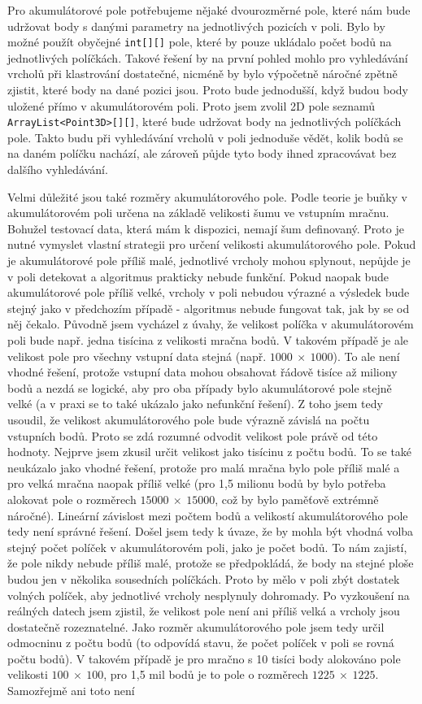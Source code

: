 \documentclass[11pt,twoside,a4paper]{book}
\begin{document}
Pro akumulátorové pole potřebujeme nějaké dvourozměrné pole, které nám bude udržovat body  s danými parametry na jednotlivých pozicích v poli. Bylo by možné použít obyčejné \verb|int[][]| pole, které by pouze ukládalo počet bodů na jednotlivých políčkách. Takové řešení by na první pohled mohlo pro vyhledávání vrcholů při klastrování dostatečné, nicméně by bylo výpočetně náročné zpětně zjistit, které body na dané pozici jsou. Proto bude jednodušší, když budou body uložené přímo v akumulátorovém poli. Proto jsem zvolil 2D pole seznamů \verb|ArrayList<Point3D>[][]|, které bude udržovat body na jednotlivých políčkách pole. Takto budu při vyhledávání vrcholů v poli jednoduše vědět, kolik bodů se na daném políčku nachází, ale zároveň půjde tyto body ihned zpracovávat bez dalšího vyhledávání. 

Velmi důležité jsou také rozměry akumulátorového pole. Podle teorie je buňky v akumulátorovém poli určena na základě velikosti šumu ve vstupním mračnu. Bohužel testovací data, která mám k dispozici, nemají šum definovaný. Proto je nutné vymyslet vlastní strategii pro určení velikosti akumulátorového pole. Pokud je akumulátorové pole příliš malé, jednotlivé vrcholy mohou splynout, nepůjde je v poli detekovat a algoritmus prakticky nebude funkční. Pokud naopak bude akumulátorové pole příliš velké, vrcholy v poli nebudou výrazné a výsledek bude stejný jako v předchozím případě - algoritmus nebude fungovat tak, jak by se od něj čekalo. Původně jsem vycházel z úvahy, že velikost políčka v akumulátorovém poli bude např. jedna tisícina z velikosti mračna bodů. V takovém případě je ale velikost pole pro všechny vstupní data stejná (např. $1000~\times~1000$). To ale není vhodné řešení, protože vstupní data mohou obsahovat řádově tisíce až miliony bodů a nezdá se logické, aby pro oba případy bylo akumulátorové pole stejně velké (a v praxi se to také ukázalo jako nefunkční řešení). Z toho jsem tedy usoudil, že velikost akumulátorového pole bude výrazně závislá na počtu vstupních bodů. Proto se zdá rozumné odvodit velikost pole právě od této hodnoty. Nejprve jsem zkusil určit velikost jako tisícinu z počtu bodů. To se také neukázalo jako vhodné řešení, protože pro malá mračna bylo pole příliš malé a pro velká mračna naopak příliš velké (pro 1,5 milionu bodů by bylo potřeba alokovat pole o rozměrech $15000~\times~15000$, což by bylo paměťově extrémně náročné). Lineární závislost mezi počtem bodů a velikostí akumulátorového pole tedy není správné řešení. Došel jsem tedy k úvaze, že by mohla být vhodná volba stejný počet políček v akumulátorovém poli, jako je počet bodů. To nám zajistí, že pole nikdy nebude příliš malé, protože se předpokládá, že body na stejné ploše budou jen v několika sousedních políčkách. Proto by mělo v poli zbýt dostatek volných políček, aby jednotlivé vrcholy nesplynuly dohromady. Po vyzkoušení na reálných datech jsem zjistil, že velikost pole není ani příliš velká a vrcholy jsou dostatečně rozeznatelné. Jako rozměr akumulátorového pole jsem tedy určil odmocninu z počtu bodů (to odpovídá stavu, že počet políček v poli se rovná počtu bodů). V takovém případě je pro mračno s 10 tisíci body alokováno pole velikosti $100~\times~100$, pro 1,5 mil bodů je to pole o rozměrech $1225~\times~1225$. Samozřejmě ani toto není 
\end{document}
